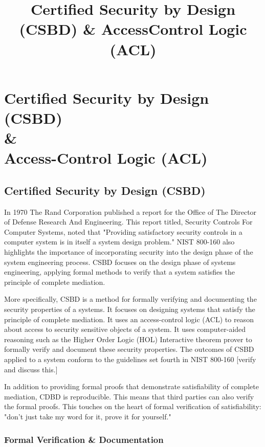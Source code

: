 \documentclass[../../main/main.tex]{subfiles}
\begin{document}
\title{Certified Security by Design (CSBD) \& Access\-Control Logic (ACL)}

\chapter[Certified Security by Design (CSBD) \& Access-Control Logic (ACL)]{Certified Security by Design (CSBD)  \\ \& \\ Access-Control Logic (ACL)} \label{chp:csbdacl}


\section{Certified Security by Design (CSBD)} \label{sec:csbd}
In 1970 The Rand Corporation published a report\cite{defensescienceboard} for the Office of The Director of Defense Research And Engineering.  This report titled, Security Controls For Computer Systems, noted that "Providing satisfactory security controls in a computer system is in itself a system design problem."  NIST 800-160 also highlights the importance of incorporating security into the design phase of the system engineering process.  CSBD focuses on the design phase of systems engineering, applying formal methods to verify that a system satisfies the principle of complete mediation.  

More specifically, CSBD is a method for formally verifying and documenting the security properties of a systems.  It focuses on designing systems that satisfy the principle of complete mediation.  It uses an access-control logic (ACL) to reason about access to security sensitive objects of a system.  It uses computer-aided reasoning such as the Higher Order Logic (HOL) Interactive theorem prover to formally verify and document these security properties.  The outcomes of CSBD applied to a system conform to the guidelines set fourth in NIST 800-160 [verify and discuss this.]

In addition to providing formal proofs that demonstrate satisfiability of complete mediation, CDBD is reproducible.  This means that third parties can also verify the formal proofs. This touches on the heart of formal verification of satisfiability: "don't just take my word for it, prove it for yourself."

\subsection{Formal Verification \& Documentation}\label{ssec:formalverifcationdocumentation}
\end{document}
